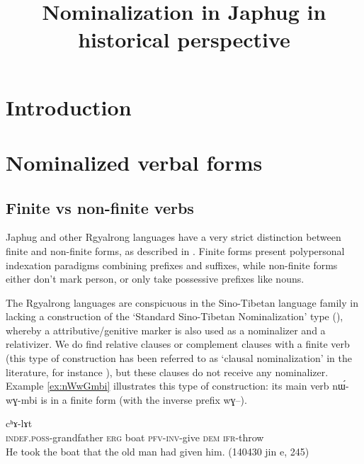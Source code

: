 \documentclass[oldfontcommands,oneside,a4paper,11pt]{article}
\newcommand{\ipa}[1]{{\phon #1}} %
\begin{document}
 
\title{Nominalization in Japhug in historical perspective}
\maketitle
\linenumbers
 
\section{Introduction}


 

\section{Nominalized verbal forms}
 
 
 
  \subsection{Finite vs non-finite verbs} \label{sec:finite.verbs}
Japhug and other Rgyalrong languages have a very strict distinction between finite and non-finite forms, as described in \citet{jacques14linking}. Finite forms present  polypersonal indexation paradigms combining prefixes and suffixes, while non-finite forms either don't mark person, or only take possessive prefixes like nouns.

The Rgyalrong languages are conspicuous in the Sino-Tibetan language family in lacking a construction of the ‘Standard Sino-Tibetan Nominalization’ type (\citealt{bickel99nmlz}), whereby a attributive/genitive marker is also used as a nominalizer and a relativizer. We do  find relative clauses or complement clauses with a finite verb (this type of construction has been referred to as `clausal nominalization' in the literature, for instance \citealt{genetti08nmlz}), but these clauses do not receive any nominalizer. Example \ref{ex:nWwGmbi} illustrates this type of construction: its main verb \ipa{nɯ́-wɣ-mbi} is in a finite form (with the inverse prefix \ipa{wɣ--}). 

 \begin{exe}
\ex \label{ex:nWwGmbi}
\gll
[\ipa{tɤ-wɯ} 	\ipa{kɯ} 	\ipa{ʑmbrɯ} 	\ipa{nɯ́-wɣ-mbi}] 	\ipa{nɯ} 	 	\ipa{cʰɤ-lɤt} \\
\textsc{indef.poss}-grandfather \textsc{erg} boat \textsc{pfv-inv}-give \textsc{dem} \textsc{ifr}-throw \\
\glt He took the boat that the old man had given him. (140430 jin e, 245)
\end{exe}
\end{document}
